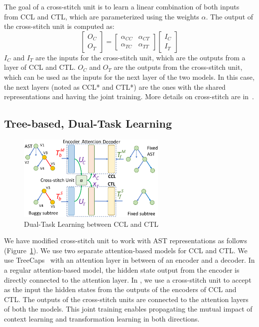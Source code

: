 The goal of a cross-stitch unit is to learn a linear combination of
both inputs from CCL and CTL, which are parameterized
using the weights $\alpha$. The output of the cross-stitch unit is
computed as:
\begin{equation}\label{eq:cross-stitch}
	\begin{bmatrix}
		O_C\\
		O_T
	\end{bmatrix}
	=
	\begin{bmatrix}
		\alpha_{CC} &  \alpha_{CT} \\
		\alpha_{TC} &  \alpha_{TT}
	\end{bmatrix}
	\begin{bmatrix}
		I_C\\
		I_T
	\end{bmatrix}
\end{equation}
$I_C$ and $I_T$ are the inputs for the cross-stitch unit, which are
the outputs from a layer of CCL and CTL. $O_C$ and $O_T$ are the
outputs from the cross-stitch unit, which can be used as the inputs
for the next layer of the two models. In this case, the next layers
(noted as CCL* and CTL*) are the ones with the shared representations
and having the joint training. More details on cross-stitch are
in~\cite{misra2016cross}.

\subsection{Tree-based, Dual-Task Learning}

\begin{figure}[t]
	\centering
	\includegraphics[width=2.8in]{graphs/dual-learning-repair-2.png}
        \vspace{-9pt}
	\caption{Dual-Task Learning between CCL and CTL}
	\label{fig:dual-learning}
\end{figure}

We have modified cross-stitch unit to work with AST representations as
follows (Figure~\ref{fig:dual-learning}). We use two separate
attention-based  models for CCL and CTL.
We use TreeCaps~\cite{bui2021treecaps} with an attention layer in
between of an encoder and a decoder. In a regular attention-based
 model, the hidden state output from the encoder is
directly connected to the attention layer. In {\tool}, we use a
cross-stitch unit to accept as the input the hidden states from the
outputs of the encoders of CCL and CTL. The outputs of the
cross-stitch units are connected to the attention layers of both the
models. This joint training enables propagating the mutual
impact of context learning and transformation learning in both
directions.

